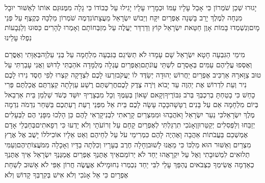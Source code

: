 \documentclass[../main/main.tex]{subfiles}
\begin{document}
\begin{multicols*}{\ncols}
יָגוּרוּ שְׁכַן שֹׁמְרוֹן כִּי אָבַל עָלָיו עַמּוֹ וּכְמָרָיו עָלָיו יָגִילוּ עַל כְּבוֹדוֹ כִּי גָלָה מִמֶּנּוּ\PreVerseSpace{}גַּם אוֹתוֹ לְאַשּׁוּר יוּבָל מִנְחָה לְמֶלֶךְ יָרֵב בָּשְׁנָה אֶפְרַיִם יִקָּח וְיֵבוֹשׁ יִשְׂרָאֵל מֵעֲצָתוֹ\PreVerseSpace{}נִדְמֶה שֹׁמְרוֹן מַלְכָּהּ כְּקֶצֶף עַל פְּנֵי מָיִם\PreVerseSpace{}וְנִשְׁמְדוּ בָּמוֹת אָוֶן חַטַּאת יִשְׂרָאֵל קוֹץ וְדַרְדַּר יַעֲלֶה עַל מִזְבְּחוֹתָם וְאָמְרוּ לֶהָרִים כַּסּוּנוּ וְלַגְּבָעוֹת נִפְלוּ עָלֵינוּ\OpenSection{}\par
{}מִימֵי הַגִּבְעָה חָטָא\SubEnd{} יִשְׂרָאֵל שָׁם עָמָדוּ לֹא תַשִּׂיגֵם בַּגִּבְעָה מִלְחָמָה עַל בְּנֵי עַלְוָה\PreVerseSpace{}בְּאַוָּתִי וְאֶסֳּרֵם וְאֻסְּפוּ עֲלֵיהֶם עַמִּים בְּאָסְרָם לִשְׁתֵּי עֲוֺנֹתָם\SubEnd{}\PreVerseSpace{}וְאֶפְרַיִם עֶגְלָה מְלֻמָּדָה אֹהַבְתִּי לָדוּשׁ וַאֲנִי עָבַרְתִּי עַל טוּב צַוָּארָהּ אַרְכִּיב אֶפְרַיִם יַחֲרוֹשׁ יְהוּדָה יְשַׂדֶּד לוֹ יַעֲקֹב\PreVerseSpace{}זִרְעוּ לָכֶם לִצְדָקָה קִצְרוּ לְפִי חֶסֶד נִירוּ לָכֶם נִיר וְעֵת לִדְרוֹשׁ אֶת יַהְוֶה עַד יָבוֹא וְיֹרֶה צֶדֶק לָכֶם\PreVerseSpace{}חֲרַשְׁתֶּם רֶשַׁע עַוְלָתָה קְצַרְתֶּם אֲכַלְתֶּם פְּרִי כָחַשׁ כִּי בָטַחְתָּ בְרִכְבְּךָ\SubEnd{} בְּרֹב גִּבּוֹרֶיךָ\PreVerseSpace{}וְקָאם שָׁאוֹן בְּעַמֶּךָ וְכָל מִבְצָרֶיךָ יוּשַּׁד כְּשֹׁד שַׁלְמַן בֵּית אַרְבֵאל בְּיוֹם מִלְחָמָה אֵם עַל בָּנִים רֻטָּשָׁה\PreVerseSpace{}כָּכָה עָשָׂה לָכֶם בֵּית אֵל מִפְּנֵי רָעַת רָעַתְכֶם בַּשַּׁחַר נִדְמֹה נִדְמָה מֶלֶךְ יִשְׂרָאֵל\PreChapterSpace{}כִּי נַעַר יִשְׂרָאֵל וָאֹהֲבֵהוּ וּמִמִּצְרַיִם קָרָאתִי לִבְנִי\PreVerseSpace{}קָרְאִי\SubEnd{} לָהֶם כֵּן הָלְכוּ מִפָּנַי הֶם\SubEnd{} לַבְּעָלִים יְזַבֵּחוּ וְלַפְּסִלִים יְקַטֵּרוּן\PreVerseSpace{}וְאָנֹכִי תִרְגַּלְתִּי לְאֶפְרַיִם קָחָם עַל זְרוֹעֹתָי\SubEnd{} וְלֹא יָדְעוּ כִּי רְפָאתִים\PreVerseSpace{}בְּחַבְלֵי אָדָם אֶמְשְׁכֵם בַּעֲבֹתוֹת אַהֲבָה וָאֶהְיֶה לָהֶם כִּמְרִימֵי עֹל עַל לְחֵיהֶם וְאַט אֵלָיו אוֹכִיל\PreVerseSpace{}לוֹ\SubEnd{} יָשֻׁב אֶל אֶרֶץ מִצְרַיִם וְאַשּׁוּר הוּא מַלְכּוֹ כִּי מֵאֲנוּ לָשׁוּב\PreVerseSpace{}וְחָלָה חֶרֶב בְּעָרָיו וְכִלְּתָה בַדָּיו וְאָכָלָה מִמֹּעֲצוֹתֵיהֶם\PreVerseSpace{}וְעַמִּי תְלוּאִים לִמְשׁוּבָתִי וְאֶל עַל יִקְרָאֻהוּ יַחַד לֹא יְרוֹמֵם\PreVerseSpace{}אֵיךְ אֶתֶּנְךָ אֶפְרַיִם אֲמַגֶּנְךָ יִשְׂרָאֵל אֵיךְ אֶתֶּנְךָ כְאַדְמָה אֲשִׂימְךָ כִּצְבֹאיִם נֶהְפַּךְ עָלַי לִבִּי יַחַד נִכְמְרוּ נִחוּמָי\PreVerseSpace{}לֹא אֶעֱשֶׂה חֲרוֹן אַפִּי לֹא אָשׁוּב לְשַׁחֵת אֶפְרָיִם כִּי אֵל אָנֹכִי וְלֹא אִישׁ בְּקִרְבְּךָ קָדוֹשׁ וְלֹא 
\end{multicols*}
\end{document}
